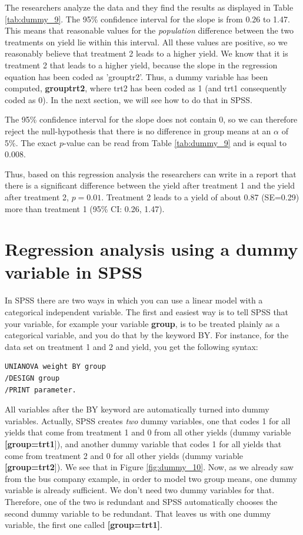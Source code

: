 \documentclass[]{book}\usepackage[]{graphicx}\usepackage[]{color}
\begin{document}
The researchers analyze the data and they find the results as displayed in Table \ref{tab:dummy_9}. The 95\% confidence interval for the slope is from 0.26 to 1.47. This means that reasonable values for the \textit{population} difference between the two treatments on yield lie within this interval. All these values are positive, so we reasonably believe that treatment 2 leads to a higher yield. We know that it is treatment 2 that leads to a higher yield, because the slope in the regression equation has been coded as 'grouptr2'. Thus, a dummy variable has been computed, \textbf{grouptrt2}, where trt2 has been coded as 1 (and trt1 consequently coded as 0). In the next section, we will see how to do that in SPSS.

The 95\% confidence interval for the slope does not contain 0, so we can therefore reject the null-hypothesis that there is no difference in group means at an $\alpha$ of 5\%. The exact $p$-value can be read from Table \ref{tab:dummy_9} and is equal to 0.008.

Thus, based on this regression analysis the researchers can write in a report that there is a significant difference between the yield after treatment 1 and the yield after treatment 2, $p=0.01$. Treatment 2 leads to a yield of about 0.87 (SE=0.29) more than treatment 1 (95\% CI: 0.26, 1.47).

\section{Regression analysis using a dummy variable in SPSS}

In SPSS there are two ways in which you can use a linear model with a categorical independent variable. The first and easiest way is to tell SPSS that your variable, for example your variable \textbf{group}, is to be treated plainly as a categorical variable, and you do that by the keyword BY. For instance, for the data set on treatment 1 and 2 and yield, you get the following syntax:

\begin{verbatim}
UNIANOVA weight BY group 
/DESIGN group
/PRINT parameter.
\end{verbatim}

All variables after the BY keyword are automatically turned into dummy variables. Actually, SPSS creates \textit{two} dummy variables, one that codes 1 for all yields that come from treatment 1 and 0 from all other yields (dummy variable \textbf{[group=trt1}]), and another dummy variable that codes 1 for all yields that come from treatment 2 and 0 for all other yields (dummy variable \textbf{[group=trt2}]). We see that in Figure \ref{fig:dummy_10}. Now, as we already saw from the bus company example, in order to model two group means, one dummy variable is already sufficient. We don't need two dummy variables for that. Therefore, one of the two is redundant and SPSS automatically chooses the second dummy variable to be redundant. That leaves us with one dummy variable, the first one called \textbf{[group=trt1]}. 
\end{document}
